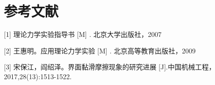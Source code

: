 
\section{参考文献}

[1] 理论力学实验指导书 [M] . 北京大学出版社，2007 

[2] 王惠明。应用理论力学实验 [M] . 北京高等教育出版社，2009

[3] 宋保江，阎绍泽。界面黏滑摩擦现象的研究进展 [J].中国机械工程，2017,28(13):1513-1522.
